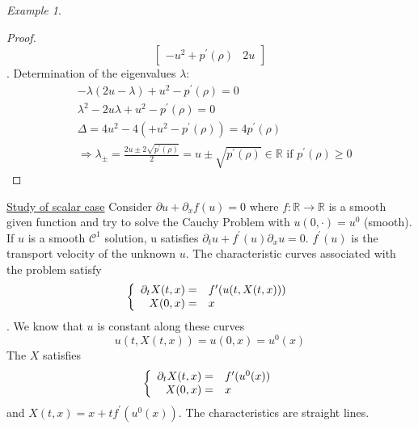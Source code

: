 \documentclass{report}
\newcommand{\R}{\ensuremath{\mathbb{R}}} %
\theoremstyle{plain}
\theoremstyle{definition}
\theoremstyle{remark}
\newtheorem*{ex}{Example}
\begin{document}
\begin{ex}
\begin{itemize}
\begin{proof}
\begin{equation}
\begin{bmatrix}
			-u^2 + p^\prime(\rho) & 2u
		\end{bmatrix}
	\end{equation}.
	Determination of the eigenvalues $\lambda$:
	\begin{align*}
		& -\lambda(2u-\lambda) + u^2 - p^\prime(\rho) = 0\\
		& \lambda^2 -2u\lambda + u^2 - p^\prime(\rho) = 0\\
		& \Delta = 4u^2 -4(+ u^2 - p^\prime(\rho)) = 4p^\prime(\rho)\\
		& \Rightarrow \lambda_\pm = 
		\frac{2u\pm 2 \sqrt{p^\prime(\rho)}}{2}
		= u \pm \sqrt{p^\prime(\rho)}\in\R
		\text{ if } p^\prime(\rho)\ge 0
	\end{align*}
\end{proof}
	\end{itemize}
\end{ex}

\underline{Study of scalar case}
Consider $\partial u + \partial_x f(u) = 0 $ where 
$f:  \R\rightarrow\R $ is a smooth given function and try to 
solve the Cauchy Problem with $u(0,\cdot) = u^0$ (smooth).
If $u$ is a smooth $\mathcal{C}^1$ solution, u satisfies
$\partial_t u + f^\prime(u)\partial_x u = 0$. 
$f^\prime (u)$ is the transport velocity of the unknown $u$.
The characteristic curves associated with the problem satisfy
\begin{equation}
	\left\lbrace
	\begin{array}[]{rl}
		\partial_t X(t,x) =& f^\prime(u(t,X(t,x)))\\
		X(0,x) =& x
	\end{array}\right.
\end{equation}.
We know that $u$ is constant along these curves
$$u(t,X(t,x))=u(0,x) =u^0(x)$$
The $X$ satisfies
\begin{equation}
	\left\lbrace
	\begin{array}[]{rl}
		\partial_t X(t,x) =& f^\prime(u^0(x))\\
		X(0,x) =& x
	\end{array}\right.
\end{equation}
and $X(t,x) = x+tf^\prime(u^0(x))$. The characteristics are
straight lines.


\end{document}
